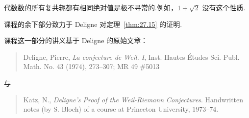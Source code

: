 代数数的所有复共轭都有相同绝对值是极不寻常的.例如，$1 + \sqrt{2}$ 没有这个性质.

课程的余下部分致力于 Deligne 对定理~\ref{thm:27.15} 的证明.

课程这一部分的讲义基于 Deligne 的原始文章：
\begin{quote}
Deligne, Pierre, \emph{La conjecture de Weil. I}, Inst. Hautes \'Etudes Sci. Publ. Math. No. 43 (1974), 273--307; MR 49 \#5013
\end{quote}
与
\begin{quote}
Katz, N., \emph{Deligne's Proof of the Weil-Riemann Conjectures}. Handwritten notes (by S. Bloch) of a course at Princeton University, 1973--74.
\end{quote}
